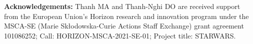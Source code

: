 \noindent\textbf{Acknowledgements:}
Thanh MA and Thanh-Nghi DO are received support from the European Union's Horizon research and innovation program under the MSCA-SE (Marie Sk\l{}odowska-Curie Actions Staff Exchange) grant agreement 101086252; Call: HORIZON-MSCA-2021-SE-01; Project title: STARWARS.